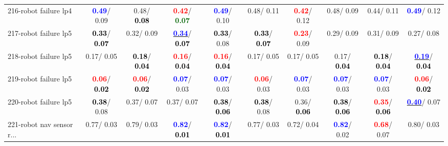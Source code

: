 \begin{table}[h]
\begin{center}
{\begin{tabular}{lc|c|c|c|c|c|c|c|c}
216-robot failure lp4 & \textcolor{blue}{\textbf{  0.49}}/  0.09 &   0.48/\textcolor{black}{\textbf{  0.08}} & \textcolor{red}{\textbf{  0.42}}/\textcolor{darkgreen}{\textbf{  0.07}} & \textcolor{blue}{\textbf{  0.49}}/  0.10 &   0.48/  0.11 & \textcolor{red}{\textbf{  0.42}}/  0.12 &   0.48/  0.09 &   0.44/  0.11 & \textcolor{blue}{\textbf{  0.49}}/  0.12 \\
217-robot failure lp5 & \textcolor{black}{\textbf{  0.33}}/\textcolor{black}{\textbf{  0.07}} &   0.32/  0.09 & \underline{\textcolor{blue}{\textbf{  0.34}}}/\textcolor{black}{\textbf{  0.07}} & \textcolor{black}{\textbf{  0.33}}/  0.08 & \textcolor{black}{\textbf{  0.33}}/\textcolor{black}{\textbf{  0.07}} & \textcolor{red}{\textbf{  0.23}}/  0.09 &   0.29/  0.09 &   0.31/  0.09 &   0.27/  0.08 \\
218-robot failure lp5 &   0.17/  0.05 & \textcolor{black}{\textbf{  0.18}}/\textcolor{black}{\textbf{  0.04}} & \textcolor{red}{\textbf{  0.16}}/\textcolor{black}{\textbf{  0.04}} & \textcolor{red}{\textbf{  0.16}}/\textcolor{black}{\textbf{  0.04}} &   0.17/  0.05 &   0.17/  0.05 &   0.17/\textcolor{black}{\textbf{  0.04}} & \textcolor{black}{\textbf{  0.18}}/\textcolor{black}{\textbf{  0.04}} & \underline{\textcolor{blue}{\textbf{  0.19}}}/\textcolor{black}{\textbf{  0.04}} \\
219-robot failure lp5 & \textcolor{red}{\textbf{  0.06}}/\textcolor{black}{\textbf{  0.02}} & \textcolor{red}{\textbf{  0.06}}/\textcolor{black}{\textbf{  0.02}} & \textcolor{blue}{\textbf{  0.07}}/  0.03 & \textcolor{blue}{\textbf{  0.07}}/  0.03 & \textcolor{red}{\textbf{  0.06}}/  0.03 & \textcolor{blue}{\textbf{  0.07}}/  0.03 & \textcolor{blue}{\textbf{  0.07}}/  0.03 & \textcolor{blue}{\textbf{  0.07}}/  0.03 & \textcolor{red}{\textbf{  0.06}}/\textcolor{black}{\textbf{  0.02}} \\
220-robot failure lp5 & \textcolor{black}{\textbf{  0.38}}/  0.08 &   0.37/  0.07 &   0.37/  0.07 & \textcolor{black}{\textbf{  0.38}}/\textcolor{black}{\textbf{  0.06}} & \textcolor{black}{\textbf{  0.38}}/  0.08 &   0.36/\textcolor{black}{\textbf{  0.06}} & \textcolor{black}{\textbf{  0.38}}/\textcolor{black}{\textbf{  0.06}} & \textcolor{red}{\textbf{  0.35}}/\textcolor{black}{\textbf{  0.06}} & \underline{\textcolor{blue}{\textbf{  0.40}}}/  0.07 \\ \hline
221-robot nav sensor r... &   0.77/  0.03 &   0.79/  0.03 & \textcolor{blue}{\textbf{  0.82}}/\textcolor{black}{\textbf{  0.01}} & \textcolor{blue}{\textbf{  0.82}}/\textcolor{black}{\textbf{  0.01}} &   0.77/  0.03 &   0.72/  0.04 & \textcolor{blue}{\textbf{  0.82}}/  0.02 & \textcolor{red}{\textbf{  0.68}}/  0.07 &   0.80/  0.03 \\

\end{tabular}}
\end{center}
\end{table}
